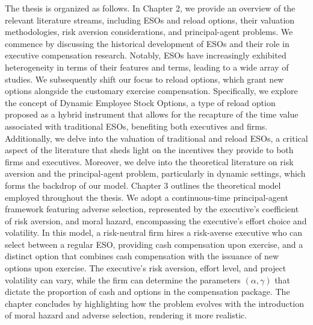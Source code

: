 The thesis is organized as follows.
In Chapter 2, we provide an overview of the relevant literature streams, including ESOs and reload options, their valuation methodologies, risk aversion considerations, and principal-agent problems. We commence by discussing the historical development of ESOs and their role in executive compensation research. Notably, ESOs have increasingly exhibited heterogeneity in terms of their features and terms, leading to a wide array of studies. We subsequently shift our focus to reload options, which grant new options alongside the customary exercise compensation. Specifically, we explore the concept of Dynamic Employee Stock Options, a type of reload option proposed as a hybrid instrument that allows for the recapture of the time value associated with traditional ESOs, benefiting both executives and firms. Additionally, we delve into the valuation of traditional and reload ESOs, a critical aspect of the literature that sheds light on the incentives they provide to both firms and executives. Moreover, we delve into the theoretical literature on risk aversion and the principal-agent problem, particularly in dynamic settings, which forms the backdrop of our model.
Chapter 3 outlines the theoretical model employed throughout the thesis. We adopt a continuous-time principal-agent framework featuring adverse selection, represented by the executive's coefficient of risk aversion, and moral hazard, encompassing the executive's effort choice and volatility. In this model, a risk-neutral firm hires a risk-averse executive who can select between a regular ESO, providing cash compensation upon exercise, and a distinct option that combines cash compensation with the issuance of new options upon exercise. The executive's risk aversion, effort level, and project volatility can vary, while the firm can determine the parameters $(\alpha, \gamma)$ that dictate the proportion of cash and options in the compensation package. The chapter concludes by highlighting how the problem evolves with the introduction of moral hazard and adverse selection, rendering it more realistic.
